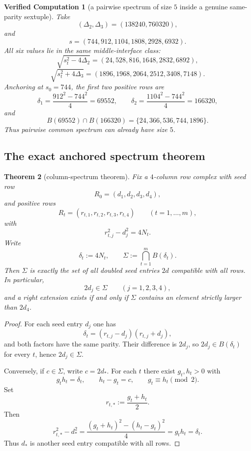 \documentclass[11pt]{article}
\theoremstyle{plainbreak}
\newtheorem{theorem}{Theorem}[section]
\theoremstyle{defbreak}
\newtheorem{computation}[theorem]{Verified Computation}
\newcommand{\Bset}{B}
\begin{document}
\begin{computation}[a pairwise spectrum of size $5$ inside a genuine same-parity sextuple]
Take
\[
(\Delta_2,\Delta_3)=(138240,760320),
\]
and
\[
s=(744,912,1104,1808,2928,6932).
\]
All six values lie in the same middle-interface class:
\[
\sqrt{s_t^2-4\Delta_2}=(24,528,816,1648,2832,6892),
\]
\[
\sqrt{s_t^2+4\Delta_3}=(1896,1968,2064,2512,3408,7148).
\]
Anchoring at $s_0=744$, the first two positive rows are
\[
\delta_1=\frac{912^2-744^2}{4}=69552,\qquad
\delta_2=\frac{1104^2-744^2}{4}=166320,
\]
and
\[
\Bset(69552)\cap \Bset(166320)=\{24,366,536,744,1896\}.
\]
Thus pairwise common spectrum can already have size $5$.
\end{computation}

\subsection{The exact anchored spectrum theorem}

\begin{theorem}[column-spectrum theorem]
Fix a $4$-column row complex with seed row
\[
R_0=(d_1,d_2,d_3,d_4),
\]
and positive rows
\[
R_t=(r_{t,1},r_{t,2},r_{t,3},r_{t,4})
\qquad (t=1,\dots,m),
\]
with
\[
r_{t,j}^2-d_j^2=4N_t.
\]
Write
\[
\delta_t:=4N_t,
\qquad
\Sigma:=\bigcap_{t=1}^m \Bset(\delta_t).
\]
Then $\Sigma$ is exactly the set of all doubled seed entries $2d$ compatible with all rows.  In particular,
\[
2d_j\in \Sigma\qquad (j=1,2,3,4),
\]
and a right extension exists if and only if $\Sigma$ contains an element strictly larger than $2d_4$.
\end{theorem}

\begin{proof}
For each seed entry $d_j$ one has
\[
\delta_t=(r_{t,j}-d_j)(r_{t,j}+d_j),
\]
and both factors have the same parity. Their difference is $2d_j$, so $2d_j\in \Bset(\delta_t)$ for every $t$, hence $2d_j\in \Sigma$.

Conversely, if $c\in \Sigma$, write $c=2d_*$. For each $t$ there exist $g_t,h_t>0$ with
\[
g_t h_t=\delta_t,\qquad h_t-g_t=c,\qquad g_t\equiv h_t\pmod 2.
\]
Set
\[
r_{t,*}:=\frac{g_t+h_t}{2}.
\]
Then
\[
r_{t,*}^2-d_*^2
=
\frac{(g_t+h_t)^2-(h_t-g_t)^2}{4}
=
g_t h_t
=
\delta_t.
\]
Thus $d_*$ is another seed entry compatible with all rows.
\end{proof}
\end{document}

